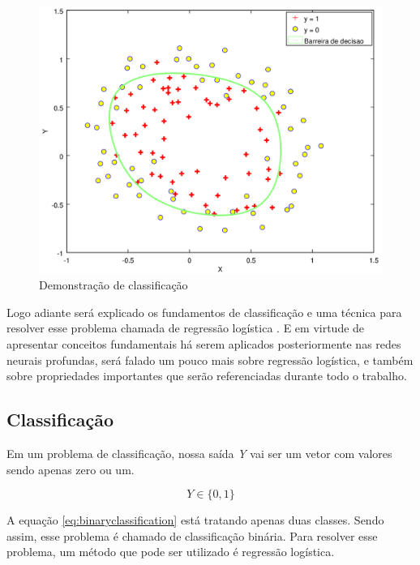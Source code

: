 \begin{figure}[htb]
  \caption{Demonstração de classificação}\label{fig:demclassificacao}
  \begin{center}
      \includegraphics[scale=0.75]{img/classificacao2}
  \end{center}
\end{figure}


Logo adiante será explicado os fundamentos de classificação e uma técnica para resolver esse problema chamada de regressão logística \cite{hosmer2004applied}. E em virtude de apresentar conceitos fundamentais há serem aplicados posteriormente nas redes neurais profundas, será falado um pouco mais sobre regressão logística, e também sobre propriedades importantes que serão referenciadas durante todo o trabalho.

\subsection{Classificação}

Em um problema de classificação, nossa saída \textit{Y} vai ser um vetor com valores sendo apenas zero ou um.

\begin{equation}\label{eq:binaryclassification}
Y \in \{0, 1\}
\end{equation}

A equação \ref{eq:binaryclassification} está tratando apenas duas classes. Sendo assim, esse problema é chamado de classificação binária. Para resolver esse problema, um método que pode ser utilizado é regressão logística.

